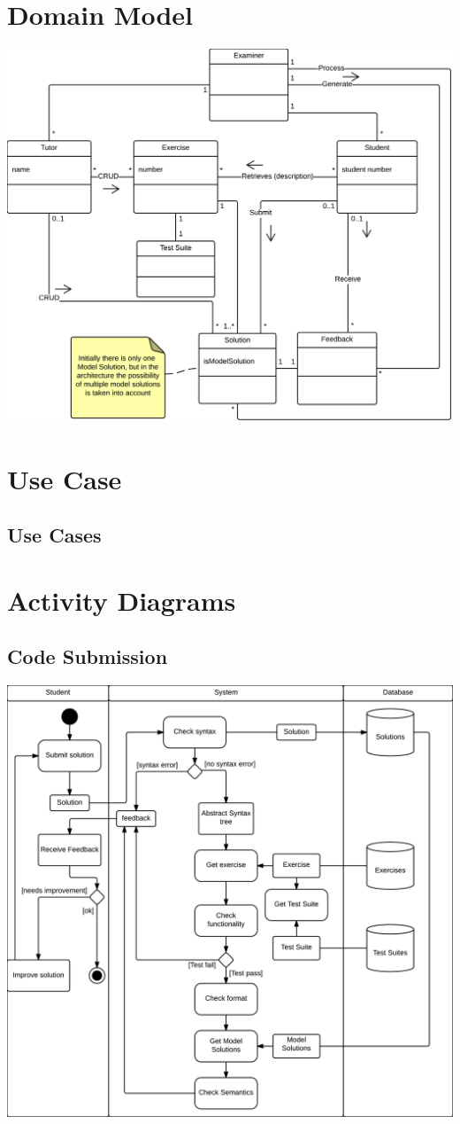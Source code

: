 \section{Domain Model}
\includegraphics[scale=0.8]{diagrams-images/domain-model}
\section{Use Case}



\subsection{Use Cases}

\section{Activity Diagrams}
\subsection{Code Submission}
\includegraphics[scale=0.8]{diagrams-images/code-submission-activity-diagram}